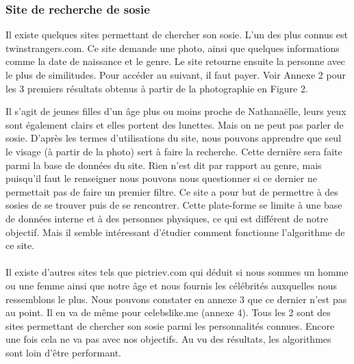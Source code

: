 \documentclass[a4paper,12pt]{article}
\begin{document}
\subsubsection{Site de recherche de sosie}
Il existe quelques sites permettant de chercher son sosie. L'un des plus connus est twinstrangers.com. Ce site demande une photo, ainsi que quelques informations comme la date de naissance et le genre. Le site retourne ensuite la personne avec le plus de similitudes. Pour accéder au suivant, il faut payer. 
Voir Annexe 2 pour les 3 premiers résultats obtenus à partir de la photographie en Figure 2. 
    
Il s'agit de jeunes filles d'un âge plus ou moins proche de Nathanaëlle, leurs yeux sont également clairs et elles portent des lunettes. Mais on ne peut pas parler de sosie. 
D'après les termes d'utilisations du site, nous pouvons apprendre que seul le visage (à partir de la photo) sert à faire la recherche. Cette dernière sera faite parmi la base de données du site. Rien n'est dit par rapport au genre, mais puisqu'il faut le renseigner nous pouvons nous questionner si ce dernier ne permettait pas de faire un premier filtre. Ce site a pour but de permettre à des sosies de se trouver puis de se rencontrer. Cette plate-forme se limite à une base de données interne et à des personnes physiques, ce qui est différent de notre objectif.
Mais il semble intéressant d'étudier comment fonctionne l'algorithme de ce site. 
\\\\
Il existe d'autres sites tels que pictriev.com qui déduit si nous sommes un homme ou une femme ainsi que notre âge et nous fournis les célébrités auxquelles nous ressemblons le plus. Nous pouvons constater en annexe 3 que ce dernier n'est pas au point. Il en va de même pour celebslike.me (annexe 4). Tous les 2 sont des sites permettant de chercher son sosie parmi les personnalités connues. Encore une fois cela ne va pas avec nos objectifs. Au vu des résultats, les algorithmes sont loin d'être performant.
\end{document}
